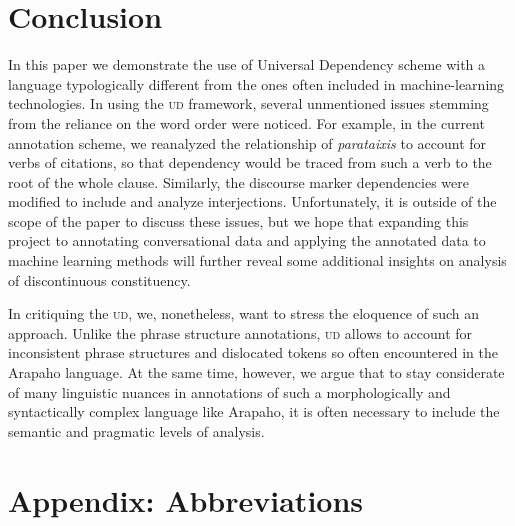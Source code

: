 \documentclass[11pt]{article}
\begin{document}
\section{Conclusion} \label{concl}
In this paper we demonstrate the use of Universal Dependency scheme with a language typologically different from the ones often included in machine-learning technologies. In using the \textsc{ud} framework, several unmentioned issues stemming from the reliance on the word order were noticed. For example, in the current annotation scheme, we reanalyzed the relationship of \textit{parataixis} to account for verbs of citations, so that dependency would be traced from such a verb to the root of the whole clause. Similarly, the discourse marker dependencies were modified to include and analyze interjections. Unfortunately, it is outside of the scope of the paper to discuss these issues, but we hope that expanding this project to annotating conversational data and applying the annotated data to machine learning methods will further reveal some additional insights on analysis of discontinuous constituency. 

In critiquing the \textsc{ud}, we, nonetheless, want to stress the eloquence of such an approach. Unlike the phrase structure annotations, \textsc{ud} allows to account for inconsistent phrase structures and dislocated tokens so often encountered in the Arapaho language. At the same time, however, we argue that to stay considerate of many linguistic nuances in annotations of such a morphologically and syntactically complex language like Arapaho, it is often necessary to include the semantic and pragmatic levels of analysis. 

\newpage
\section*{Appendix: Abbreviations}
\end{document}
